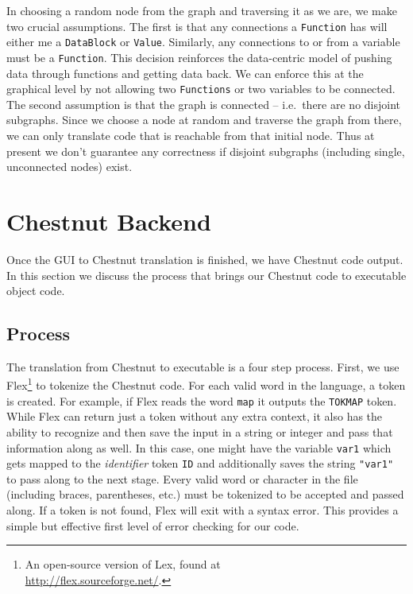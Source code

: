 \documentclass[twocolumn]{article}
\renewcommand{\|}{\origbar} %
\newcommand{\code}[1]{\texttt{#1}}
\begin{document}
In choosing a random node from the graph and traversing it as we are, we make two crucial assumptions. The first is that any connections a \code{Function} has will either me a \code{DataBlock} or \code{Value}. Similarly, any connections to or from a variable must be a \code{Function}. This decision reinforces the data-centric model of pushing data through functions and getting data back. We can enforce this at the graphical level by not allowing two \code{Functions} or two variables to be connected. The second assumption is that the graph is connected -- i.e.\ there are no disjoint subgraphs. Since we choose a node at random and traverse the graph from there, we can only translate code that is reachable from that initial node. Thus at present we don't guarantee any correctness if disjoint subgraphs (including single, unconnected nodes) exist.

\section{Chestnut Backend}

Once the GUI to Chestnut translation is finished, we have Chestnut code output. In this section we discuss the process that brings our Chestnut code to executable object code.

\subsection{Process}

The translation from Chestnut to executable is a four step process. First, we use Flex\footnote{An open-source version of Lex, found at \\ \url{http://flex.sourceforge.net/}.} to tokenize the Chestnut code. For each valid word in the language, a token is created. For example, if Flex reads the word \code{map} it outputs the \code{TOKMAP} token. While Flex can return just a token without any extra context, it also has the ability to recognize and then save the input in a string or integer and pass that information along as well. In this case, one might have the variable \code{var1} which gets mapped to the {\em identifier} token \code{ID} and additionally saves the string \code{"var1"} to pass along to the next stage. Every valid word or character in the file (including braces, parentheses, etc.) must be tokenized to be accepted and passed along. If a token is not found, Flex will exit with a syntax error. This provides a simple but effective first level of error checking for our code.
\end{document}
